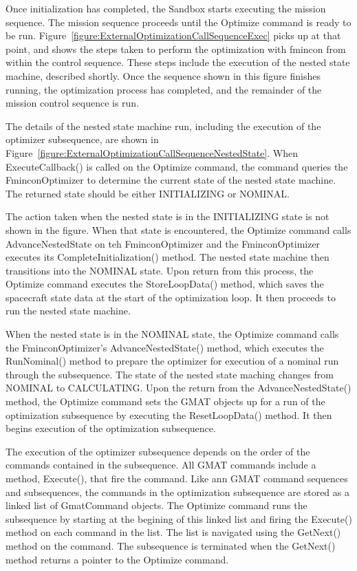 Once initialization has completed, the Sandbox starts executing the mission sequence.  The mission
sequence proceeds until the Optimize command is ready to be run.
Figure~\ref{figure:ExternalOptimizationCallSequenceExec} picks up at that point, and shows the steps
taken to perform the optimization with fmincon from within the control sequence.  These steps
include the execution of the nested state machine, described shortly.  Once the sequence shown in
this figure finishes running, the optimization process has completed, and the remainder of the
mission control sequence is run.

The details of the nested state machine run, including the execution of the optimizer subsequence,
are shown in Figure~\ref{figure:ExternalOptimizationCallSequenceNestedState}.  When
ExecuteCallback() is called on the Optimize command, the command queries the FminconOptimizer to
determine the current state of the nested state machine.  The returned state should be either
INITIALIZING or NOMINAL.

The action taken when the nested state is in the INITIALIZING state is not shown in the figure.
When that state is encountered, the Optimize command calls AdvanceNestedState on teh
FminconOptimizer and the FminconOptimizer executes its CompleteInitialization() method.
The nested state machine then transitions into the NOMINAL state.  Upon return from this process,
the Optimize command executes the StoreLoopData() method, which saves the spacecraft state data
at the start of the optimization loop.  It then proceeds to run the nested state machine.

When the nested state is in the NOMINAL state, the Optimize command calls the FminconOptimizer's
AdvanceNestedState() method, which executes the RunNominal() method to prepare the optimizer for
execution of a nominal run through the subsequence.  The state of the nested state maching changes
from NOMINAL to CALCULATING.  Upon the return from the AdvanceNestedState() method, the Optimize
command sets the GMAT objects up for a run of the optimization subsequence by executing the
ResetLoopData() method. It then begins execution of the optimization subsequence.

The execution of the optimizer subsequence depends on the order of the commands contained in the
subsequence.  All GMAT commands include a method, Execute(), that fire the command.  Like ann
GMAT command sequences and subsequences, the commands in the optimization subsequence are stored as
a linked list of GmatCommand objects. The Optimize command runs the subsequence by starting at the
begining of this linked list and firing the Execute() method on each command in the list.  The list
is navigated using the GetNext() method on the command.  The subsequence is terminated when the
GetNext() method returns a pointer to the Optimize command.

